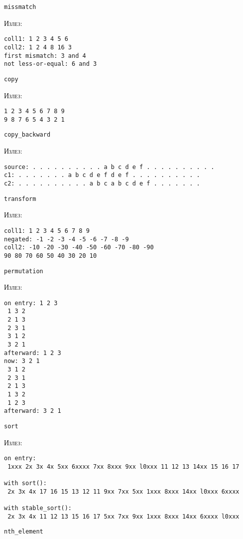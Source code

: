 \texttt{missmatch}


\textsc{Излез:}
\begin{verbatim}
coll1: 1 2 3 4 5 6 
coll2: 1 2 4 8 16 3 
first mismatch: 3 and 4
not less-or-equal: 6 and 3
\end{verbatim}

\texttt{copy}


\textsc{Излез:}
\begin{verbatim}
1 2 3 4 5 6 7 8 9 
9 8 7 6 5 4 3 2 1 
\end{verbatim}

\texttt{copy\_backward}


\textsc{Излез:}
\begin{verbatim}
source: . . . . . . . . . . a b c d e f . . . . . . . . . . 
c1: . . . . . . . a b c d e f d e f . . . . . . . . . . 
c2: . . . . . . . . . . a b c a b c d e f . . . . . . .
\end{verbatim}

\texttt{transform}


\textsc{Излез:}
\begin{verbatim}
coll1: 1 2 3 4 5 6 7 8 9 
negated: -1 -2 -3 -4 -5 -6 -7 -8 -9 
coll2: -10 -20 -30 -40 -50 -60 -70 -80 -90 
90 80 70 60 50 40 30 20 10
\end{verbatim}


\texttt{permutation}


\textsc{Излез:}
\begin{verbatim}
on entry: 1 2 3 
 1 3 2 
 2 1 3 
 2 3 1 
 3 1 2 
 3 2 1 
afterward: 1 2 3 
now: 3 2 1 
 3 1 2 
 2 3 1 
 2 1 3 
 1 3 2 
 1 2 3 
afterward: 3 2 1
\end{verbatim}

\texttt{sort}


\textsc{Излез:}
\begin{verbatim}
on entry:
 1xxx 2x 3x 4x 5xx 6xxxx 7xx 8xxx 9xx l0xxx 11 12 13 14xx 15 16 17 

with sort():
 2x 3x 4x 17 16 15 13 12 11 9xx 7xx 5xx 1xxx 8xxx 14xx l0xxx 6xxxx 

with stable_sort():
 2x 3x 4x 11 12 13 15 16 17 5xx 7xx 9xx 1xxx 8xxx 14xx 6xxxx l0xxx 
\end{verbatim}

\texttt{nth\_element}


